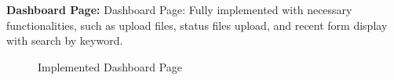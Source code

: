 \documentclass[12pt,oneside,openright,a4paper]{cpe-english-project}
\begin{document}
\textbf{Dashboard Page:} Dashboard Page: Fully implemented with necessary functionalities,  such as upload files, status files upload, and recent form display with search by keyword.

\begin{figure}[H]
\centering
{}
\caption{Implemented Dashboard Page}\label{fig:dashboard-result}
\end{figure}







\end{document}
